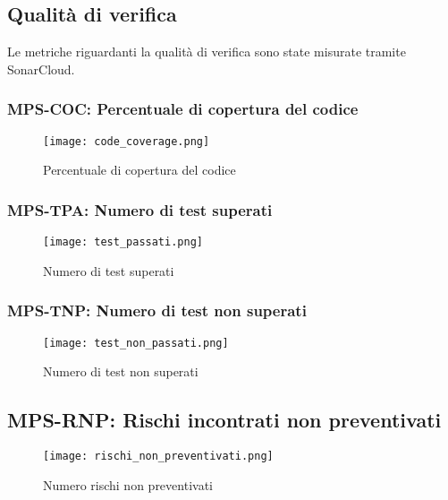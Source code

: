 \documentclass[../piano-di-qualifica.tex]{subfiles}
\begin{document}
\newpage


\subsection{Qualità di verifica}%
\label{sub:qualita_verifica_report}
Le metriche riguardanti la qualità di verifica sono state misurate tramite SonarCloud.

\subsubsection{MPS-COC\@: Percentuale di copertura del codice}%
\label{subs:percentuale_cop_codice}
\begin{figure}[H]
  \centering
  \texttt{[image: code\_coverage.png]}%
  \caption{Percentuale di copertura del codice}%
  \label{fig:percentuale_cop_codice}%
\end{figure}

\subsubsection{MPS-TPA\@: Numero di test superati}%
\label{subs:test_non_superati}
\begin{figure}[H]
  \centering
  \texttt{[image: test\_passati.png]}%
  \caption{Numero di test superati}%
  \label{fig:test_non_superati}%
\end{figure}

\subsubsection{MPS-TNP\@: Numero di test non superati}%
\label{subs:test_superati}
\begin{figure}[H]
  \centering
  \texttt{[image: test\_non\_passati.png]}%
  \caption{Numero di test non superati}%
  \label{fig:test_superati}%
\end{figure}





\subsection{MPS-RNP\@: Rischi incontrati non preventivati}%
\label{sub:rischi_non_preventivati_report}

\begin{figure}[H]
  \centering
  \texttt{[image: rischi\_non\_preventivati.png]}%
  \caption{Numero rischi non preventivati}%
  \label{fig:rischi_non_preventivati}%
\end{figure}
\end{document}
